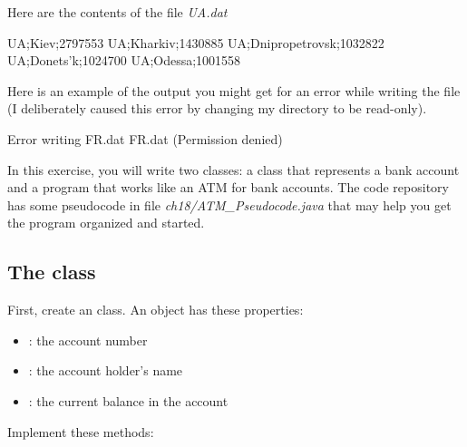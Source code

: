 \begin{exercise}
Here are the contents of the file {\em UA.dat}

\begin{stdout}
UA;Kiev;2797553
UA;Kharkiv;1430885
UA;Dnipropetrovsk;1032822
UA;Donets'k;1024700
UA;Odessa;1001558
\end{stdout}

Here is an example of the output you might get for an error while writing the file (I deliberately caused this error by changing my directory to be read-only).

\begin{stdout}
Error writing FR.dat
FR.dat (Permission denied)
\end{stdout}

\end{exercise}

\begin{exercise}
In this exercise, you will write two classes: a class that represents a bank account and a program that works like an ATM for bank accounts. The code repository has some pseudocode in file {\em ch18/ATM\_Pseudocode.java} that may help you get the program organized and started. 

\subsection*{The  class}
First, create an  class. An  object has these properties:

\begin{itemize}
    \item {}: the account number
    \item {}: the account holder's name
    \item {}: the current balance in the account
\end{itemize}

Implement these methods:


\end{exercise}
